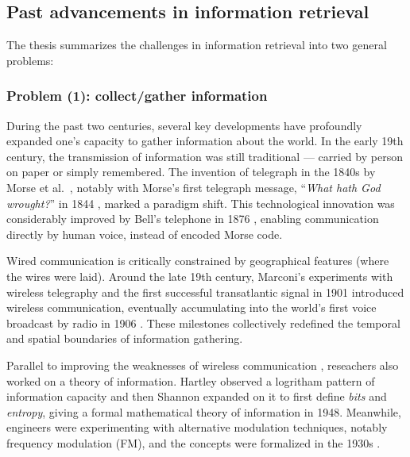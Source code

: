 \documentclass[final-report]{report-template}
\begin{document}
\subsection{Past advancements in information retrieval} 
\label{sec.info.ret.history}
The thesis summarizes the challenges in information retrieval into two general
problems: 
\subsubsection{Problem (1): collect/gather information}
During the past two centuries, several key developments have profoundly
expanded one's capacity to gather information about the world. In
the early 19th century, the transmission of information was still traditional
--- carried by person on paper or simply remembered. The invention of
telegraph in the 1840s by Morse et al.\ \cite{history.telegraph.1,
history.telegraph.2}, notably with Morse's first telegraph message,
``\emph{What hath God wrought?}'' in 1844 \cite{first.telegraph.msg}, marked a
paradigm shift. This technological innovation was considerably improved by
Bell's telephone in 1876 \cite{history.telephone.1, history.telephone.2},
enabling communication directly by human voice, instead of encoded Morse code.

Wired communication is critically constrained by geographical features (where
the wires were laid). Around the late 19th century, Marconi's experiments with
wireless telegraphy \cite{history.wireless.1} and the first successful
transatlantic signal in 1901 \cite{history.first.atlantic.broadcast} introduced
wireless communication, eventually accumulating into the world's first voice
broadcast by radio in 1906 \cite{first.voice.broadcast}. These milestones
collectively redefined the temporal and spatial boundaries of information
gathering.

Parallel to improving the weaknesses of wireless communication
\cite{wireless.weakness.1, wireless.weakness.2, wireless.weakness.3},
reseachers also worked on a theory of information.
Hartley observed a logritham pattern of information capacity
\cite{hartley.log.information} and then Shannon expanded on it to first define
\emph{bits} and \emph{entropy}, giving a formal mathematical theory of
information \cite{shannon.theory.communication} in 1948. Meanwhile,
engineers were experimenting with alternative modulation techniques, notably
frequency modulation (FM), and the concepts were formalized in the 1930s
\cite{history.modulation}. 
\end{document}
